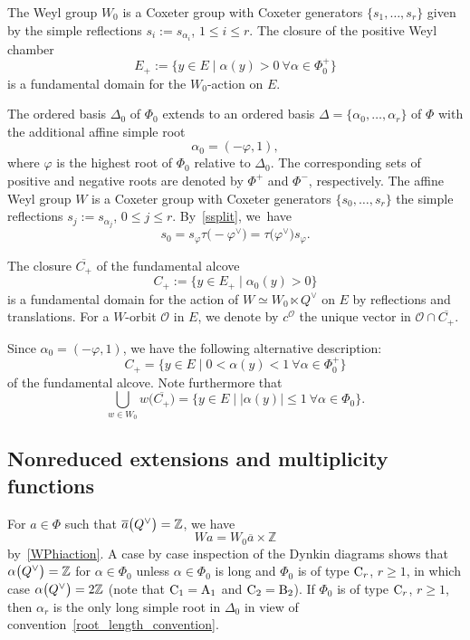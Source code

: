 \documentclass[11pt]{article}
\numberwithin{equation}{section}
\numberwithin{equation}{section}
\begin{document}
The Weyl group $W_0$ is a Coxeter group with Coxeter generators $\{s_1,\dots,s_r\}$ given by the simple reflections $s_i:=s_{\alpha_i}$, $1\leq i\leq r$. The closure of the positive Weyl chamber
\begin{equation*}%
E_+:=\bigl\{y\in E \mid \alpha(y)>0\ \forall \alpha\in\Phi_0^+ \bigr\}
\end{equation*}
is a fundamental domain for the $W_0$-action on $E$.

The ordered basis $\Delta_0$ of $\Phi_0$ extends to an ordered basis
$\Delta=\{\alpha_0,\dots,\alpha_r\}$ of $\Phi$ with the additional affine simple root
\[
\alpha_0=(-\varphi,1),
\]
where $\varphi$ is the highest root of $\Phi_0$ relative to $\Delta_0$. The corresponding sets of positive and negative roots are denoted by $\Phi^+$ and $\Phi^-$, respectively.
The affine Weyl group $W$ is a Coxeter group with Coxeter generators $\{s_0,\dots,s_r\}$ the simple reflections $s_j:=s_{\alpha_j}$, $0\leq j\leq r$. By~\eqref{ssplit}, we~have
\[
s_0=s_\varphi\tau\bigl(-\varphi^\vee\bigr)=\tau\bigl(\varphi^\vee\bigr)s_\varphi.
\]

The closure $\overline{C_+}$ of the fundamental alcove
\begin{equation*}%
C_+:=\{y\in E_+ \mid \alpha_0(y)>0\}
\end{equation*}
is a fundamental domain for the action of $W\simeq W_0\ltimes Q^\vee$ on $E$ by reflections and translations.
For a $W$-orbit $\mathcal{O}$ in $E$, we denote by
$c^\mathcal{O}$ the unique vector in $\mathcal{O}\cap \overline{C_+}$.

Since $\alpha_0=(-\varphi,1)$, we have the following alternative description:
\[
C_+=\bigl\{y\in E \mid 0<\alpha(y)<1 \ \forall \alpha\in\Phi_0^+\bigr\}
\]
of the fundamental alcove.
Note furthermore that
\begin{equation}\label{W0C}
\bigcup_{w\in W_0}w\bigl(\overline{C_+}\bigr)=\{y\in E \mid |\alpha(y)|\leq 1\ \forall \alpha\in\Phi_0\}.
\end{equation}

\subsection{Nonreduced extensions and multiplicity functions}

For $a\in\Phi$ such that $\overline{a}\smash{\bigl(Q^\vee\bigr)}=\mathbb{Z}$, we have
\[
Wa=W_0 \overline{a}\times\mathbb{Z}
\]
by~\eqref{WPhiaction}. A case by case inspection of the Dynkin diagrams shows that $\alpha\smash{\bigl(Q^\vee\bigr)}=\mathbb{Z}$ for $\alpha\in\Phi_0$ unless $\alpha\in\Phi_0$ is long and
 $\Phi_0$ is of type ${\rm C}_r$, $r\geq 1$, in which case $\alpha\smash{\bigl(Q^\vee\bigr)}=2\mathbb{Z}$ (note that ${\rm C}_1=\textup{A}_1$ and ${\rm C}_2=\textup{B}_2$).
If $\Phi_0$ is of type ${\rm C}_r$, $r\geq 1$, then $\alpha_r$ is the only long simple root in $\Delta_0$ in view of convention~\ref{root_length_convention}.
\end{document}
